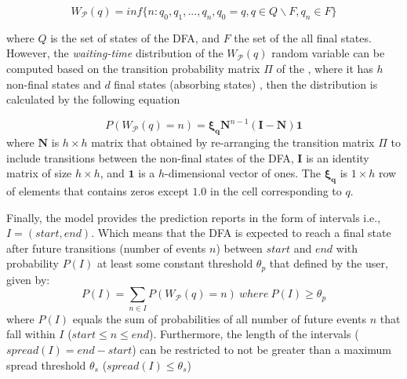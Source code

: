 \begin{equation*}
W_{\mathcal{P}}(q)=inf\{n: q_{0},q_{1},...,q_{n}, q_{0}=q, q \in Q \backslash F, q_{n} \in F\}
\end{equation*}

where $Q$ is the set of states of the DFA, and $F$ the set of the  all final states. However, the \textit{waiting-time} distribution of the $W_{\mathcal{P}}(q)$ random variable can be computed based on the transition probability matrix $\Pi$ of the \pmcmr, where it has $h$ non-final states and $d$ final states (absorbing states) \cite{alevizos2017event}, then the distribution is calculated by the following equation 

\begin{equation*}
P(W_{\mathcal{P}}(q)=n)=\boldsymbol{\xi_{q}}\boldsymbol{N}^{n-1}(\boldsymbol{I}-\boldsymbol{N})\boldsymbol{1}
\end{equation*}
where $\boldsymbol{N}$ is $h \times h$ matrix that obtained by re-arranging the transition matrix $\Pi$ to include transitions between the non-final states of the DFA, $\boldsymbol{I}$ is an identity matrix of size $h \times h$, and  $\boldsymbol{1}$ is a $h$-dimensional vector of ones. The $\boldsymbol{\xi_{q}}$ is $1 \times h$ row of elements that contains zeros except $1.0$ in the cell corresponding to $q$. 
\par Finally, the model provides the prediction reports in the form of intervals i.e.,  $I=(\mathit{start},\mathit{end})$. Which means that the DFA is expected to reach a final state  after future transitions (number of events $n$) between $\mathit{start}$ and $\mathit{end}$ with probability $P(I)$ at least some constant threshold $\theta_{p}$ that defined by the user, given by:
\begin{equation*}
P(I)=\sum_{n \in I}{P(W_{\mathcal{P}}(q)=n)}\ where\  P(I) \geq \theta_{p} 
\end{equation*}
where $P(I)$ equals the sum of probabilities of all number of future events $n$ that fall within $I$ ($start\leq n\leq end$). Furthermore, the length of the intervals ($spread(I) = end - start$)  can be restricted to not be greater than a maximum spread threshold $\theta_{s}$ ($spread(I)\leq \theta_{s}$)



